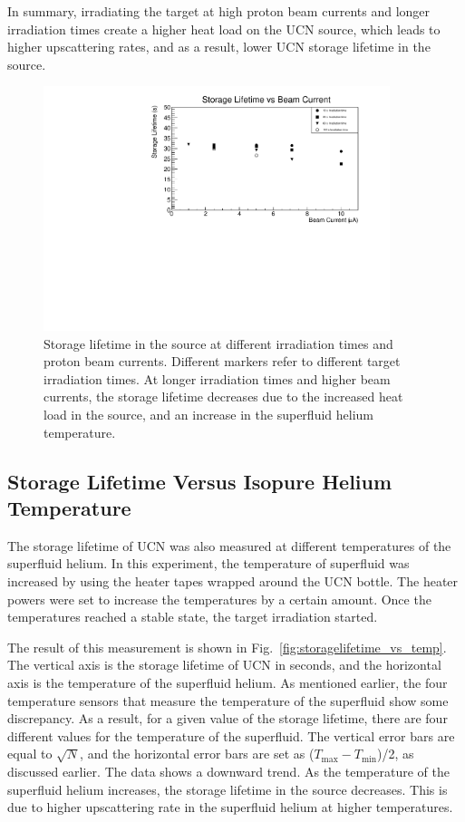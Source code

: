 In summary, irradiating the target at high proton beam currents and
longer irradiation times create a higher heat load on the UCN source,
which leads to higher upscattering rates, and as a result, lower UCN
storage lifetime in the source.

\begin{figure}[h!]
  \centering
  \includegraphics[width=0.9\textwidth]{StorageLifetime_17009_and_17009A.pdf}
  \caption{Storage lifetime in the source at different irradiation
    times and proton beam currents. Different markers refer to
    different target irradiation times. At longer irradiation times
    and higher beam currents, the storage lifetime decreases due to the
    increased heat load in the source, and an increase in the
    superfluid helium temperature. }
  \label{fig:storage_beam_irrad}
\end{figure}


\subsection{Storage Lifetime Versus Isopure Helium Temperature}
The storage lifetime of UCN was also measured at different
temperatures of the superfluid helium. In this experiment, the
temperature of superfluid was increased by using the heater tapes
wrapped around the UCN bottle. The heater powers were set to increase
the temperatures by a certain amount. Once the temperatures reached a
stable state, the target irradiation started.

The result of this measurement is shown in
Fig.~\ref{fig:storagelifetime_vs_temp}. The vertical axis is the
storage lifetime of UCN in seconds, and the horizontal axis is the
temperature of the superfluid helium. As mentioned earlier, the four
temperature sensors that measure the temperature of the superfluid
show some discrepancy. As a result, for a given value of the storage
lifetime, there are four different values for the temperature of the
superfluid. The vertical error bars are equal to $\sqrt{N}$, and the
horizontal error bars are set as
($T_{\mathrm{max}} - T_{\mathrm{min}}$)/2, as discussed earlier. The
data shows a downward trend. As the temperature of the superfluid
helium increases, the storage lifetime in the source decreases. This
is due to higher upscattering rate in the superfluid helium at
higher temperatures.


